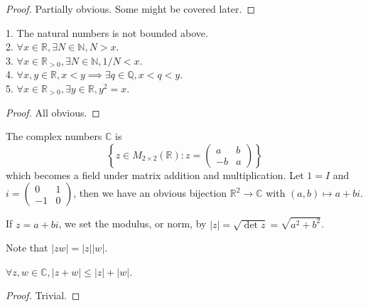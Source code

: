 \begin{proof}
    Partially obvious.
    Some might be covered later.
\end{proof}
\begin{proposition}
    1. The natural numbers is not bounded above.\\
    2. $\forall x\in\mathbb R,\exists N\in\mathbb N,N>x$.\\
    3. $\forall x\in\mathbb R_{>0},\exists N\in\mathbb N,1/N<x$.\\
    4. $\forall x,y\in\mathbb R,x<y\implies\exists q\in\mathbb Q,x<q<y$.\\
    5. $\forall x\in\mathbb R_{>0},\exists y\in\mathbb R,y^2=x$.
\end{proposition}
\begin{proof}
    All obvious.
\end{proof}
\begin{definition}
    The complex numbers $\mathbb C$ is
    $$\left\{ z\in M_{2\times 2}(\mathbb R):z=\begin{pmatrix}
        a&b\\
        -b&a
    \end{pmatrix}\right\}$$
    which becomes a field under matrix addition and multiplication.
    Let $1=I$ and $i=\left(\begin{smallmatrix}
        0&1\\
        -1&0
    \end{smallmatrix}\right)$, then we have an obvious bijection $\mathbb R^2\to\mathbb C$ with $(a,b)\mapsto a+bi$.
\end{definition}
\begin{definition}
    If $z=a+bi$, we set the modulus, or norm, by $|z|=\sqrt{\det z}=\sqrt{a^2+b^2}$.
\end{definition}
Note that $|zw|=|z||w|$.
\begin{proposition}
    $\forall z,w\in\mathbb C,|z+w|\le |z|+|w|$.
\end{proposition}
\begin{proof}
    Trivial.
\end{proof}